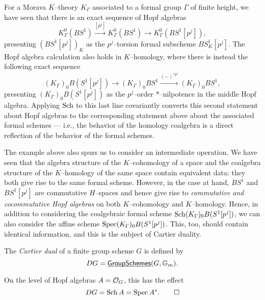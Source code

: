 \begin{example}
For a Morava $K$--theory $K_\Gamma$ associated to a formal group $\Gamma$ of finite height, we have seen that there is an exact sequence of Hopf algebras \[K_\Gamma^0(BS^1) \xrightarrow{[p^j]} K_\Gamma^0(BS^1) \to K_\Gamma^0(BS^1[p^j]),\] presenting $(BS^1[p^j])_K$ as the $p^j$--torsion formal subscheme $BS^1_K[p^j]$.  The Hopf algebra calculation also holds in $K$--homology, where there is instead the following exact sequence \[(K_\Gamma)_0 B(S^1[p^j]) \to (K_\Gamma)_0 BS^1 \xrightarrow{(-)^{\ast p^j}} (K_\Gamma)_0 BS^1,\] presenting $(K_\Gamma)_0 B(S^1[p^j])$ as the $p^j$--order $\ast$--nilpotence in the middle Hopf algebra.  Applying $\operatorname{Sch}$ to this last line covariantly converts this second statement about Hopf algebras to the corresponding statement above about the associated formal schemes --- i.e., the behavior of the homology coalgebra is a direct reflection of the behavior of the formal schemes.
\end{example}

The example above also spurs us to consider an intermediate operation.  We have seen that the algebra structure of the $K$--cohomology of a space and the coalgebra structure of the $K$--homology of the same space contain equivalent data: they both give rise to the same formal scheme.  However, in the case at hand, $BS^1$ and $BS^1[p^j]$ are commutative $H$--spaces and hence give rise to \emph{commutative and cocommutative Hopf algebras} on both $K$--cohomology and $K$--homology.  Hence, in addition to considering the coalgebraic formal scheme $\operatorname{Sch} (K_\Gamma)_0 B(S^1[p^j])$, we can also consider the affine scheme $\operatorname{Spec} (K_\Gamma)_0 B(S^1[p^j])$.  This, too, should contain identical information, and this is the subject of Cartier duality.

\begin{definition}
The \textit{Cartier dual} of a finite group scheme $G$ is defined by \[DG = \operatorname{\underline{\smash{\mathsf{GroupSchemes}}}}(G, \mathbb G_m).\]
\end{definition}

\begin{lemma}
On the level of Hopf algebras $A = \mathcal{O}_G$, this has the effect \[DG = \operatorname{Sch} A = \operatorname{Spec} A^*. \qed\]
\end{lemma}

